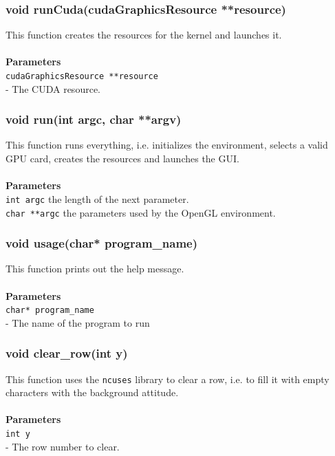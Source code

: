\documentclass[a4paper, 10pt]{article}
\def\mar{\hspace*{5mm}}
\begin{document}
        \vspace{1cm}
        \subsubsection{void runCuda(cudaGraphicsResource **resource)}
        This function creates the resources for the kernel and launches it.\\
        \\{\bf Parameters}\\
        \verb|cudaGraphicsResource **resource|\\\mar- The CUDA resource.

        \vspace{1cm}
        \subsubsection{void run(int argc, char **argv)}
        This function runs everything, i.e. initializes the environment, selects
        a valid GPU card, creates the resources and launches the GUI.\\
        \\{\bf Parameters}\\
        \verb|int argc| the length of the next parameter.\\
        \verb|char **argc| the parameters used by the OpenGL environment.\\

        \vspace{1cm}
        \subsubsection{void usage(char* program\_name)}
        This function prints out the help message.\\
        \\{\bf Parameters}\\
        \verb|char* program_name|\\\mar- The name of the program to run

        \vspace{1cm}
        \subsubsection{void clear\_row(int y)}
        This function uses the \verb|ncuses| library to clear a row, i.e. to fill it with
        empty characters with the background attitude.\\
        \\{\bf Parameters}\\
        \verb|int y|\\\mar- The row number to clear.
\end{document}
